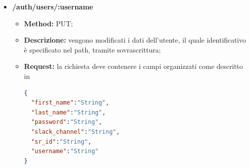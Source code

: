 \begin{itemize}
\begin{itemize}
\item \textbf{Method:} POST;
\item \textbf{Descrizione:} vengono inviati i dati necessari all'aggiunta di un nuovo  al database;
\item \textbf{Request:} la richiesta deve contenere i campi organizzati come descritto in\\ :
\begin{lstlisting}[language=json,firstnumber=1]
{
  "first_name":"String",
  "last_name":"String",
  "password":"String",
  "slack_channel":"String",
  "sr_id":"String",
  "username":"String"
}
\end{lstlisting}

\item \textbf{Response 200:} Nel caso la richiesta vada a buon fine, la chiamata restituirà la seguente risposta:
\begin{lstlisting}[language=json,firstnumber=1]
{
  "message":"success"
}
\end{lstlisting}
\item \textbf{Response 400:} Nel caso la richiesta fatta non rispetti il formato sopra descritto, la chiamata restituirà la seguente risposta:
\begin{lstlisting}[language=json,firstnumber=1]
{
  "status":400,
  "msg":"Bad Request"
}
\end{lstlisting}
\item \textbf{Response 500:} Nel caso si verifichino degli errori durante il tentativo di soddisfare la richiesta, la chiamata restituirà la seguente risposta:
\begin{lstlisting}[language=json,firstnumber=1]
{
  "message":"Messaggio relativo all'errore"
}
\end{lstlisting}\end{itemize}

\item \textbf{/auth/users/:username}\\

\begin{itemize}
\item \textbf{Method:} PUT;
\item \textbf{Descrizione:} vengono modificati i dati dell'utente, il quale identificativo è specificato nel path, tramite sovrascrittura;
\item \textbf{Request:} la richiesta deve contenere i campi organizzati come descritto in \\
\begin{lstlisting}[language=json,firstnumber=1]
{
  "first_name":"String",
  "last_name":"String",
  "password":"String",
  "slack_channel":"String",
  "sr_id":"String",
  "username":"String"
}
\end{lstlisting}


\end{itemize}
\end{itemize}
